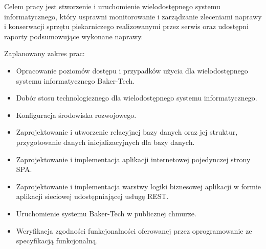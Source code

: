 Celem pracy jest stworzenie i uruchomienie wielodostępnego systemu informatycznego, który
usprawni monitorowanie i zarządzanie zleceniami naprawy i konserwacji sprzętu piekarniczego
realizowanymi przez serwis oraz udostępni raporty podsumowujące wykonane naprawy.

Zaplanowany zakres prac:
\begin{itemize}
    \item Opracowanie poziomów dostępu i przypadków użycia dla wielodostępnego systemu informatycznego Baker-Tech.
    \item Dobór stosu technologicznego dla wielodostępnego systemu informatycznego.
    \item Konfiguracja środowiska rozwojowego.
    \item Zaprojektowanie i utworzenie relacyjnej bazy danych oraz jej struktur, przygotowanie danych inicjalizacyjnych dla bazy danych.
    \item Zaprojektowanie i implementacja aplikacji internetowej pojedynczej strony SPA.
    \item Zaprojektowanie i implementacja warstwy logiki biznesowej aplikacji w formie aplikacji sieciowej udostępniającej usługę REST.
    \item Uruchomienie systemu Baker-Tech w publicznej chmurze.
    \item Weryfikacja zgodności funkcjonalności oferowanej przez oprogramowanie ze specyfikacją funkcjonalną.
\end{itemize}